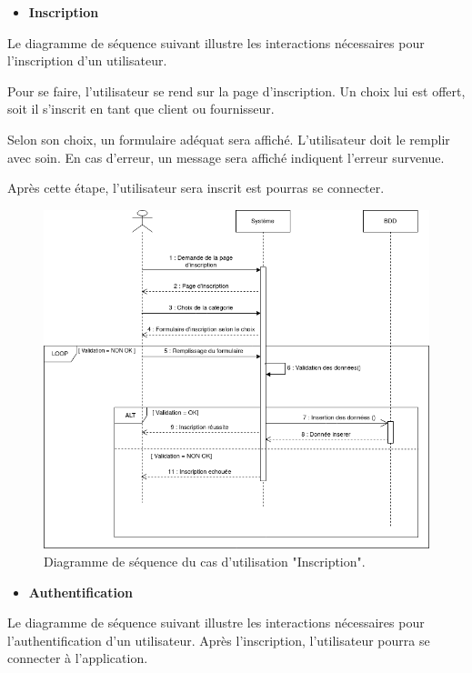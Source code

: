 \documentclass[french]{report}
\begin{document}
\begin{itemize}
\item \textbf{Inscription} 
\end{itemize}
	Le diagramme de séquence suivant illustre les interactions nécessaires
	pour l'inscription d'un utilisateur.
	
	Pour se faire, l'utilisateur se rend sur la page d'inscription.
	Un choix lui est offert, soit il s'inscrit en tant que client ou fournisseur.
	
	Selon son choix, un formulaire adéquat sera affiché. 
	L'utilisateur doit le remplir avec soin. En cas d'erreur, un message sera affiché indiquent l'erreur survenue.
	
	Après cette étape, l'utilisateur sera inscrit est pourras se connecter.
	
        \begin{figure}[H]
            \centering
            \includegraphics[width=1\textwidth]{images/Untitled Diagram.drawio.png}
            \caption{Diagramme de séquence du cas d'utilisation "Inscription".}
            \label{fig:my_label}
        \end{figure}
        

\begin{itemize}
\item \textbf{Authentification} 
\end{itemize}
	Le diagramme de séquence suivant illustre les interactions nécessaires pour 
	l'authentification d'un utilisateur. Après l'inscription, l'utilisateur pourra 
	se connecter à l'application. 
	
\end{document}
